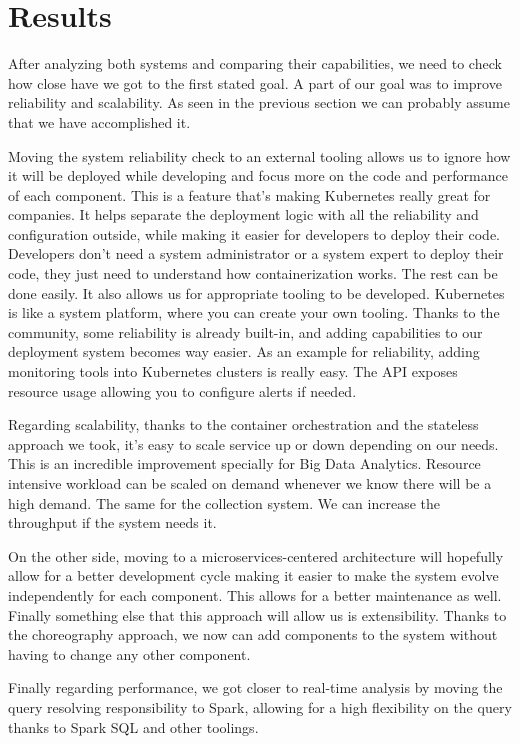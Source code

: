 
\chapter{Results} %

\label{Chapter7} %

After analyzing both systems and comparing their capabilities, we need to check how close have we got to the first stated goal. A part of our goal was to improve reliability and scalability. As seen in the previous section we can probably assume that we have accomplished it. 

Moving the system reliability check to an external tooling allows us to ignore how it will be deployed while developing and focus more on the code and performance of each component. This is a feature that’s making Kubernetes really great for companies. It helps separate the deployment logic with all the reliability and configuration outside, while making it easier for developers to deploy their code. Developers don’t need a system administrator or a system expert to deploy their code, they just need to understand how containerization works. The rest can be done easily. It also allows us for appropriate tooling to be developed. Kubernetes is like a system platform, where you can create your own tooling. Thanks to the community, some reliability is already built-in, and adding capabilities to our deployment system becomes way easier. As an example for reliability, adding monitoring tools into Kubernetes clusters is really easy. The API exposes resource usage allowing you to configure alerts if needed.

Regarding scalability, thanks to the container orchestration and the stateless approach we took, it’s easy to scale service up or down depending on our needs. This is an incredible improvement specially for Big Data Analytics. Resource intensive workload can be scaled on demand whenever we know there will be a high demand. The same for the collection system. We can increase the throughput if the system needs it. 

On the other side, moving to a microservices-centered architecture will hopefully allow for a better development cycle making it easier to make the system evolve independently for each component. This allows for a better maintenance as well. Finally something else that this approach will allow us is extensibility. Thanks to the choreography approach, we now can add components to the system without having to change any other component.

Finally regarding performance, we got closer to real-time analysis by moving the query resolving responsibility to Spark, allowing for a high flexibility on the query thanks to Spark SQL and other toolings.

